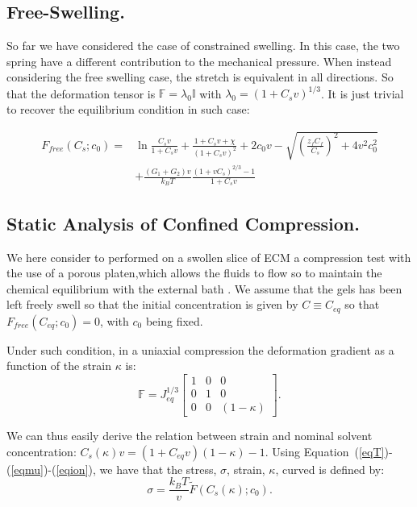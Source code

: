 \documentclass[12pt]{extarticle}
\newcommand{\F}{\ensuremath{\mathbb{F}}}
\begin{document}
\subsection{Free-Swelling.}
So far we have considered the case of constrained swelling. In this case, the two spring have a different contribution to the mechanical pressure. When instead considering the free swelling case, the stretch is equivalent in all directions. So that the deformation tensor is $\F=\lambda_0 \mathbb{I}$ with $\lambda_0=(1+C_sv)^{1/3}$. It is just trivial to recover the equilibrium condition in such case:

\begin{equation}
\begin{aligned}
F_{free}(C_s; c_0)=&\ln \frac{C_sv}{1+C_sv} +\frac{1+C_sv+\chi}{(1+C_sv)^2}+2c_0v-\sqrt{\left(\frac{z_fC_f}{C_s}\right)^2+4v^2c^2_0} \\[1.5mm]
&+\frac{(G_1+G_2)v}{k_BT} \frac{(1+vC_s)^{2/3}-1}{1+C_sv}
\end{aligned}
\end{equation}

\subsection{Static Analysis of Confined Compression.}
We here consider to performed on a swollen slice of ECM a compression test with the use of a porous platen,which allows the fluids to flow so to maintain the chemical equilibrium with the external bath \cite{Netti}. We assume that the gels has been left freely swell so that the initial concentration is given by $C\equiv C_{eq}$ so that $F_{free}(C_{eq};c_0)=0$, with $c_0$ being fixed.

Under such condition, in a uniaxial compression the deformation gradient as a function of the strain $\kappa$ is:
\begin{equation}
\F=J^{1/3}_{eq} \begin{bmatrix}
1 &0&0\\
0&1&0\\
0&0& (1-\kappa)
\end{bmatrix}. 
\end{equation}

We can thus easily derive the relation between strain and nominal solvent concentration:
$C_s(\kappa)v= (1+C_{eq}v)(1-\kappa)-1$. Using Equation~(\ref{eqT})-(\ref{eqmu})-(\ref{eqion}), we have that the stress, $\sigma$, strain, $\kappa$, curved is defined by:
\begin{equation}
\sigma=\frac{k_BT}{v}\tilde{F}(C_s(\kappa);c_0).
\end{equation}
\end{document}
